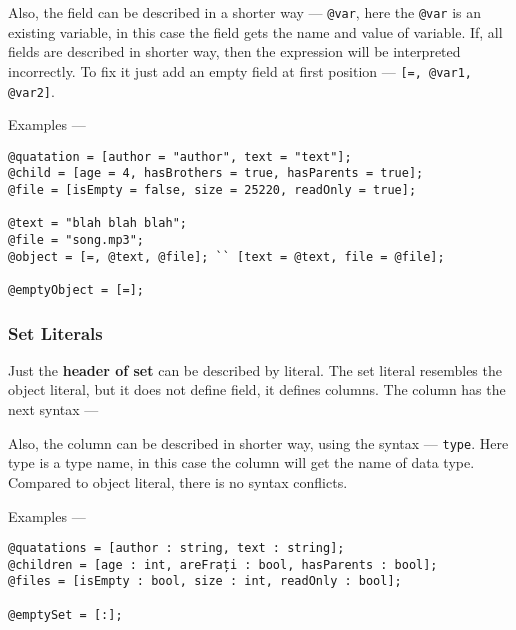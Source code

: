 Also, the field can be described in a shorter way — \texttt{@var}, here the \texttt{@var} is an existing variable, in this case the field gets the name and value of variable. If, all fields are described in shorter way, then the expression will be interpreted incorrectly. To fix it just add an empty field at first position — \texttt{[=, @var1, @var2]}.

Examples —
\begin{verbatim}
@quatation = [author = "author", text = "text"];
@child = [age = 4, hasBrothers = true, hasParents = true];
@file = [isEmpty = false, size = 25220, readOnly = true];

@text = "blah blah blah";
@file = "song.mp3";
@object = [=, @text, @file]; `` [text = @text, file = @file];

@emptyObject = [=];
\end{verbatim}

\subsubsection{Set Literals}

Just the {\bf header of set} can be described by literal. The set literal resembles the object literal, but it does not define field, it defines columns. The column has the next syntax —

Also, the column can be described in shorter way, using the syntax — \texttt{type}. Here type is a type name, in this case the column will get the name of data type. Compared to object literal, there is no syntax conflicts.

Examples —
\begin{verbatim}
@quatations = [author : string, text : string];
@children = [age : int, areFrați : bool, hasParents : bool];
@files = [isEmpty : bool, size : int, readOnly : bool];

@emptySet = [:];
\end{verbatim}
